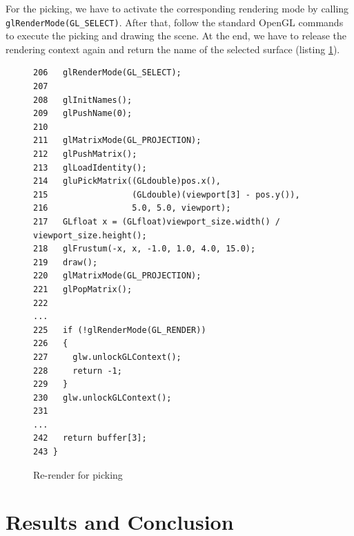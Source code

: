 \documentclass[jou,noapacite]{apa}
\renewcommand{\figurename}{Listing}
\begin{document}
For the picking, we have to activate the corresponding rendering mode by
calling \lstinline|glRenderMode(GL_SELECT)|.
%
After that, follow the standard OpenGL commands to execute the picking and
drawing the scene.
%
At the end, we have to release the rendering context again and return the name
of the selected surface (listing \ref{lst:picking}).
%
\begin{figure}[h]
\begin{lstlisting}[basicstyle=\scriptsize]
206   glRenderMode(GL_SELECT);
207
208   glInitNames();
209   glPushName(0);
210
211   glMatrixMode(GL_PROJECTION);
212   glPushMatrix();
213   glLoadIdentity();
214   gluPickMatrix((GLdouble)pos.x(),
215                 (GLdouble)(viewport[3] - pos.y()),
216                 5.0, 5.0, viewport);
217   GLfloat x = (GLfloat)viewport_size.width() /               viewport_size.height();
218   glFrustum(-x, x, -1.0, 1.0, 4.0, 15.0);
219   draw();
220   glMatrixMode(GL_PROJECTION);
221   glPopMatrix();
222
...
225   if (!glRenderMode(GL_RENDER))
226   {
227     glw.unlockGLContext();
228     return -1;
229   }
230   glw.unlockGLContext();
231
...
242   return buffer[3];
243 }
\end{lstlisting}
\caption{Re-render for picking}
\label{lst:picking}
\end{figure}

\section{Results and Conclusion}

\renewcommand{\figurename}{Figure}
\setcounter{figure}{0}
\end{document}
